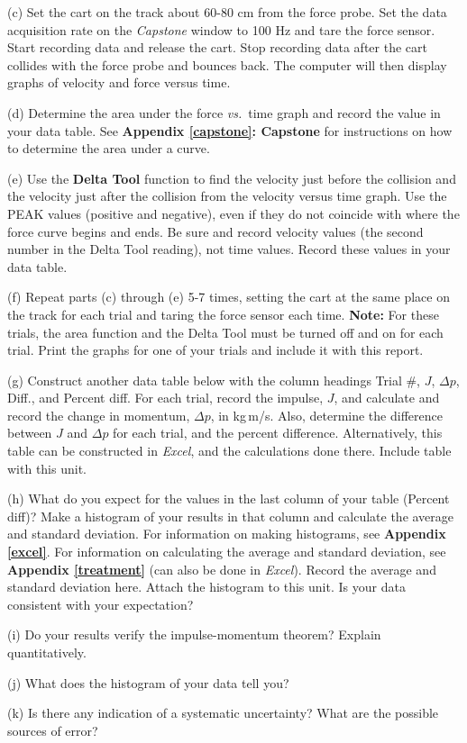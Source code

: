 \newpage


(c) Set the cart on the track about 60-80 cm from the force probe. Set the data acquisition rate 
on the {\it Capstone} window to 100 Hz and tare the force sensor.
Start recording data and release the cart. Stop recording data after the cart collides with the force probe and bounces back. 
The computer will then display graphs of velocity and force versus time.

(d) Determine the area under the force \textit{vs.}~time graph and record the value in
your data table. See \textbf{Appendix \ref{capstone}: Capstone} for instructions on how to determine the area under a curve.

(e) Use the \textbf{Delta Tool} function to find the velocity just before the collision and the
velocity just after the collision from the velocity versus time graph. Use the 
PEAK values (positive and negative), even if they do not coincide with where 
the force curve begins and ends. Be sure and record velocity values 
(the second number in the Delta Tool reading), not time values. 
Record these values in your data table.

(f) Repeat parts (c) through (e) 5-7 times, setting the cart at the same place on the track for each trial and taring the force sensor each time. 
\textbf{Note:} For these trials, the area function and the Delta Tool must be turned off and on for each trial. 
Print the graphs for one of your trials and include it with this report.

(g) Construct another data table below with the column headings
Trial \#, $J$, \( \Delta  p\), Diff., and Percent diff. For each trial, record
the impulse, $J$, and calculate and record the change in momentum, \( \Delta  p\), in kg\,m/s. Also, determine the difference between $J$ and $\Delta p$  for 
each trial, and the percent difference. Alternatively, this table can be constructed in \textit{Excel}, and the calculations done there. Include table with this unit.
\vspace{60mm}

(h) What do you expect for the values in the last column of your table (Percent diff)? Make a histogram of your results in that column and calculate the average and standard deviation. For information on making histograms, see \textbf{Appendix \ref{excel}}. For information on calculating the average and standard deviation, see \textbf{Appendix \ref{treatment}} (can also be done in \textit{Excel}). Record the average and standard 
deviation here. Attach the histogram to this unit. Is your data consistent with your expectation?
\vspace{15mm}

(i) Do your results verify the impulse-momentum theorem? Explain quantitatively.
\vspace{15mm}

(j) What does the histogram of your data tell you?
\vspace{15mm}

(k) Is there any indication of a systematic uncertainty? What are the possible
sources of error?

